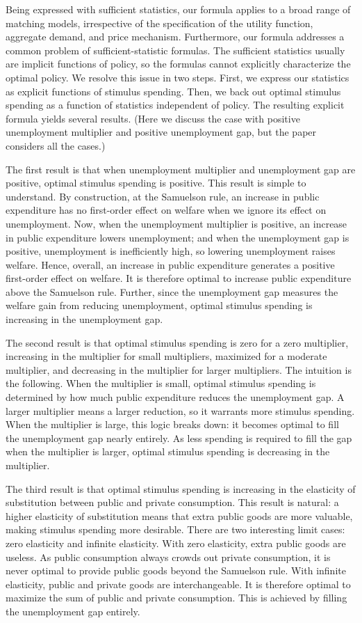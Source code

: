\documentclass[letterpaper,12pt,leqno]{article}
\begin{document}
\begin{bibunit}
Being expressed with sufficient statistics, our formula applies to a broad range of matching models, irrespective of the specification of the utility function, aggregate demand, and price mechanism. Furthermore, our formula addresses a common problem of sufficient-statistic formulas. The sufficient statistics usually are implicit functions of policy, so the formulas cannot explicitly characterize the optimal policy. We resolve this issue in two steps. First, we express our statistics as explicit functions of stimulus spending. Then, we back out optimal stimulus spending as a function of statistics independent of policy. The resulting explicit formula yields several results. (Here we discuss the case with positive unemployment multiplier and positive unemployment gap, but the paper considers all the cases.)

The first result is that when unemployment multiplier and unemployment gap are positive, optimal stimulus spending is positive. This result is simple to understand. By construction, at the Samuelson rule, an increase in public expenditure has no first-order effect on welfare when we ignore its effect on unemployment. Now, when the unemployment multiplier is positive, an increase in public expenditure lowers unemployment; and when the unemployment gap is positive, unemployment is inefficiently high, so lowering unemployment raises welfare. Hence, overall, an increase in public expenditure generates a positive first-order effect on welfare. It is therefore optimal to increase public expenditure above the Samuelson rule. Further, since the unemployment gap measures the welfare gain from reducing unemployment, optimal stimulus spending is increasing in the unemployment gap.

The second result is that optimal stimulus spending is zero for a zero multiplier, increasing in the multiplier for small multipliers, maximized for a moderate multiplier, and decreasing in the multiplier for larger multipliers. The intuition is the following. When the multiplier is small, optimal stimulus spending is determined by how much public expenditure reduces the unemployment gap. A larger multiplier means a larger reduction, so it warrants more stimulus spending. When the multiplier is large, this logic breaks down: it becomes optimal to fill the unemployment gap nearly entirely. As less spending is required to fill the gap when the multiplier is larger, optimal stimulus spending is decreasing in the multiplier.

The third result is that optimal stimulus spending is increasing in the elasticity of substitution between public and private consumption. This result is natural: a higher elasticity of substitution means that extra public goods are more valuable, making stimulus spending more desirable. There are two interesting limit cases: zero elasticity and infinite elasticity. With zero elasticity, extra public goods are useless. As public consumption always crowds out private consumption, it is never optimal to provide public goods beyond the Samuelson rule. With infinite elasticity, public and private goods are interchangeable. It is therefore optimal to maximize the sum of public and private consumption. This is achieved by filling the unemployment gap entirely. 


\end{bibunit}
\end{document}
